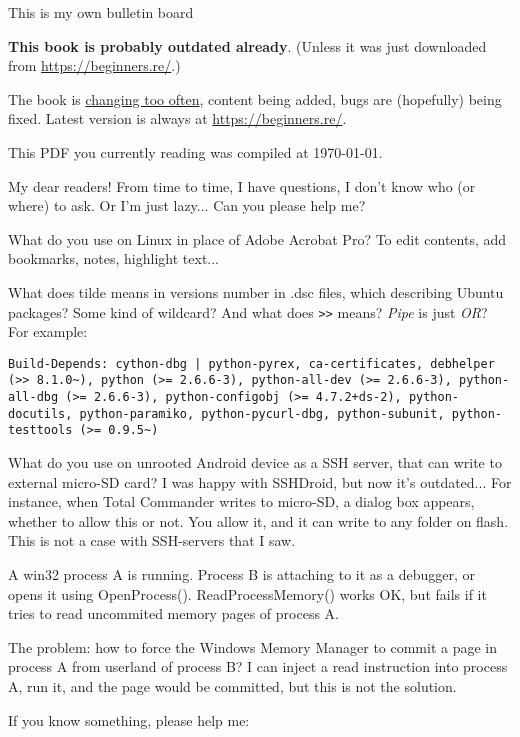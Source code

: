 
\begin{center}
\LARGE{} This is my own bulletin board \normalsize{}
\end{center}

\textbf{This book is probably outdated already}.
(Unless it was just downloaded from \url{https://beginners.re/}.)

The book is \href{https://github.com/DennisYurichev/RE-for-beginners/commits/master}{changing too often},
content being added, bugs are (hopefully) being fixed.
Latest version is always at \url{https://beginners.re/}.

This PDF you currently reading was compiled at \today{}.

\myhrule{}

My dear readers! From time to time, I have questions, I don't know who (or where) to ask.
Or I'm just lazy...
Can you please help me?

\myhrule{}

What do you use on Linux in place of Adobe Acrobat Pro?
To edit contents, add bookmarks, notes, highlight text...

\myhrule{}

What does tilde means in versions number in .dsc files, which describing Ubuntu packages?
Some kind of wildcard?
And what does \verb|>>| means?
\emph{Pipe} is just \emph{OR}?
For example:

\begin{lstlisting}
Build-Depends: cython-dbg | python-pyrex, ca-certificates, debhelper (>> 8.1.0~), python (>= 2.6.6-3), python-all-dev (>= 2.6.6-3), python-all-dbg (>= 2.6.6-3), python-configobj (>= 4.7.2+ds-2), python-docutils, python-paramiko, python-pycurl-dbg, python-subunit, python-testtools (>= 0.9.5~)
\end{lstlisting}

\myhrule{}

What do you use on unrooted Android device as a SSH server, that can write to external micro-SD card?
I was happy with SSHDroid, but now it's outdated...
For instance, when Total Commander writes to micro-SD, a dialog box appears, whether to allow this or not.
You allow it, and it can write to any folder on flash.
This is not a case with SSH-servers that I saw.

\myhrule{}

A win32 process A is running.
Process B is attaching to it as a debugger, or opens it using OpenProcess().
ReadProcessMemory() works OK, but fails if it tries to read uncommited memory pages of process A.

The problem: how to force the Windows Memory Manager to commit a page in process A from userland of process B?
I can inject a read instruction into process A, run it, and the page would be committed, but this is not the solution.

\myhrule{}

If you know something, please help me: \EMAIL{}

